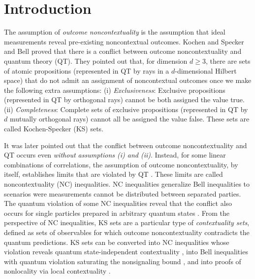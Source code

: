 \documentclass[%
 twocolumn,
 groupedaddress,
 showpacs,
 showkeys,
 preprintnumbers,
 amsmath,amssymb,
 aps,
 pra,
 longbibliography,
 floatfix,
 ]{revtex4-1}
\begin{document}


\maketitle


\section{Introduction}


The assumption of {\em outcome noncontextuality} is the assumption that ideal measurements reveal pre-existing noncontextual outcomes. Kochen and Specker \cite{Specker60,KS65,KS67} and Bell \cite{Bell66} proved that there is a conflict between outcome noncontextuality and quantum theory (QT). They pointed out that, for dimension $d \geq 3$, there are sets of atomic propositions (represented in QT by rays in a $d$-dimensional Hilbert space) that do not admit an assignment of noncontextual outcomes once we make the following extra assumptions: (i) {\em Exclusiveness}: Exclusive propositions (represented in QT by orthogonal rays) cannot be both assigned the value true. (ii) {\em Completeness}: Complete sets of exclusive propositions (represented in QT by $d$ mutually orthogonal rays) cannot all be assigned the value false. These sets are called Kochen-Specker (KS) sets.

It was later pointed out that the conflict between outcome noncontextuality and QT occurs even {\em without assumptions (i) and (ii)}. Instead, for some linear combinations of correlations, the assumption of outcome noncontextuality, by itself, establishes limits that are violated by QT \cite{KCBS08,Cabello08}. These limits are called noncontextuality (NC) inequalities. NC inequalities generalize Bell inequalities \cite{Bell64} to scenarios were measurements cannot be distributed between separated parties. The quantum violation of some NC inequalities reveal that the conflict also occurs for single particles prepared in arbitrary quantum states \cite{Cabello08,BBCP09,YO12,KBLGC12}. From the perspective of NC inequalities, KS sets are a particular type of {\em contextuality sets}, defined as sets of observables for which outcome noncontextuality contradicts the quantum predictions. KS sets can be converted into NC inequalities whose violation reveals quantum state-independent contextuality \cite{KZGKGCBR09, ARBC09}, into Bell inequalities with quantum violation saturating the nonsignaling bound \cite{Cabello01,AGA12}, and into proofs of nonlocality via local contextuality \cite{Cabello10,CAB12,LHC16}.
\end{document}
